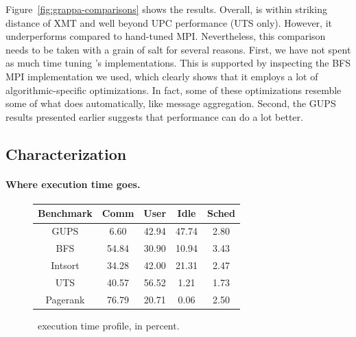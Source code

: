 Figure~\ref{fig:grappa-comparisons} shows the results. Overall, \Grappa is
within striking distance of XMT and well beyond UPC performance (UTS only).
However, it underperforms compared to hand-tuned MPI. Nevertheless, this
comparison needs to be taken with a grain of salt for several reasons. First,
we have not spent as much time tuning \Grappa's implementations. This is
supported by inspecting the BFS MPI implementation we used, which clearly
shows that it employs a lot of algorithmic-specific optimizations. In fact,
some of these optimizations resemble some of what \Grappa does automatically,
like message aggregation. Second, the GUPS results presented earlier suggests
that \Grappa performance can do a lot better. 

\subsection{Characterization}

\paragraph{Where execution time goes.}


\begin{figure}[ht]
    \begin{center}
      \begin{tabular}{c|c c c c}
        Benchmark     & Comm & User & Idle & Sched \\ \hline
        GUPS          & 6.60  & 42.94   & 47.74 & 2.80 \\
        BFS           & 54.84 & 30.90   & 10.94 & 3.43 \\ 
        Intsort       & 34.28 & 42.00   & 21.31 & 2.47 \\ 
        UTS           & 40.57 & 56.52   &  1.21 & 1.73 \\
        Pagerank      & 76.79 & 20.71   &  0.06 & 2.50 \\
      \end{tabular}
    \end{center}
    \caption{\Grappa\ execution time profile, in percent.}
    \label{fig:grappa-profile}
\end{figure}


